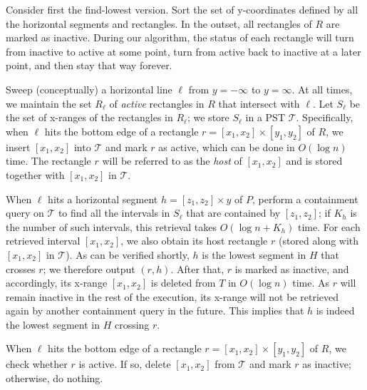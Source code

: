 \documentclass[acmsmall,review,anonymous]{acmart}
\def\vgap{\vspace{1mm}}
\def\extraspacing{\vspace{2mm} \noindent}
\def\T{\mathcal{T}}
\begin{document}
{{{\extraspacing {\bf Algorithm for Problem $\bm{\mathscr{D}}$.} Consider first the find-lowest version. Sort the set of y-coordinates defined by all the horizontal segments and rectangles. In the outset, all rectangles of $R$ are marked as inactive. During our algorithm, the status of each rectangle will turn from inactive to active at some point, turn from active back to inactive at a later point, and then stay that way forever.


\vgap

Sweep (conceptually) a horizontal line $\ell$ from $y = -\infty$ to $y = \infty$. At all times, we maintain the set $R_\ell$ of {\em active} rectangles in $R$ that intersect with $\ell$. Let $S_\ell$ be the set of x-ranges of the rectangles in $R_\ell$; we store $S_\ell$ in a PST $\T$. Specifically, when $\ell$ hits the bottom edge of a rectangle $r = [x_1, x_2] \times [y_1, y_2]$ of $R$, we insert $[x_1, x_2]$ into $\T$ and mark $r$ as active, which can be done in $O(\log n)$ time. The rectangle $r$ will be referred to as the {\em host} of $[x_1, x_2]$ and is stored together with $[x_1, x_2]$ in $\T$.

\vgap

When $\ell$ hits a horizontal segment $h = [z_1, z_2] \times y$ of $P$, perform a containment query on $\T$ to find all the intervals in $S_\ell$ that are contained by $[z_1, z_2]$; if $K_h$ is the number of such intervals, this retrieval takes $O(\log n + K_h)$ time. For each retrieved interval $[x_1, x_2]$, we also obtain its host rectangle $r$ (stored along with $[x_1, x_2]$ in $\T$). As can be verified shortly, $h$ is the lowest segment in $H$ that crosses $r$; we therefore output $(r, h)$. After that, $r$ is marked as inactive, and accordingly, its x-range $[x_1, x_2]$ is deleted from $T$ in $O(\log n)$ time. As $r$ will remain inactive in the rest of the execution, its x-range will not be retrieved again by another containment query in the future. This implies that $h$ is indeed the lowest segment in $H$ crossing $r$.

\vgap

When $\ell$ hits the bottom edge of a rectangle $r = [x_1, x_2] \times [y_1, y_2]$ of $R$, we check whether $r$ is active. If so, delete $[x_1, x_2]$ from $\T$ and mark $r$ as inactive; otherwise, do nothing.

}}}
\end{document}
